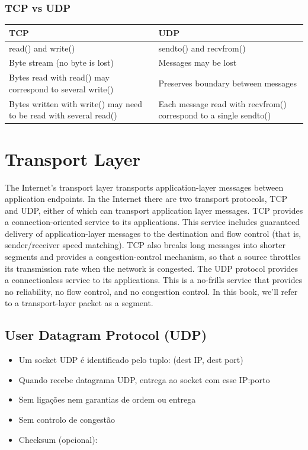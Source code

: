 \documentclass[12pt]{article}
\begin{document}
\subsubsection*{TCP vs UDP}

\begin{tabular}{ p{3in} | p{3in} }
    TCP & UDP \\\hline
    read() and write() & sendto() and recvfrom() \\\hline
    Byte stream (no byte is lost) & Messages may be lost \\\hline
    Bytes read with read() may correspond to several write() & Preserves boundary between messages \\\hline
    Bytes written with write() may need to be read with several read() & Each message read with recvfrom() correspond to a single sendto() \\
\end{tabular}

\newpage

\section{Transport Layer}

The Internet's transport layer transports application-layer messages between application endpoints. In the Internet there are two transport protocols, TCP and UDP, either of which can transport application layer messages. TCP provides a connection-oriented service to its applications. This service includes guaranteed delivery of application-layer messages to the destination and flow control (that is, sender/receiver speed matching). TCP also breaks long messages into shorter segments and provides a congestion-control mechanism, so that a source throttles its transmission rate when the network is congested. The UDP protocol provides a connectionless service to its applications. This is a no-frills service that provides no reliability, no flow control, and no congestion control. In this book, we'll refer to a transport-layer packet as a segment.

\subsection{User Datagram Protocol (UDP)}

\begin{itemize}
    \item Um socket UDP é identificado pelo tuplo: (dest IP, dest port)
    \item Quando recebe datagrama UDP, entrega ao socket com esse IP:porto
    \item Sem ligações nem garantias de ordem ou entrega
    \item Sem controlo de congestão
    \item Checksum (opcional): %
\end{itemize}
\end{document}
